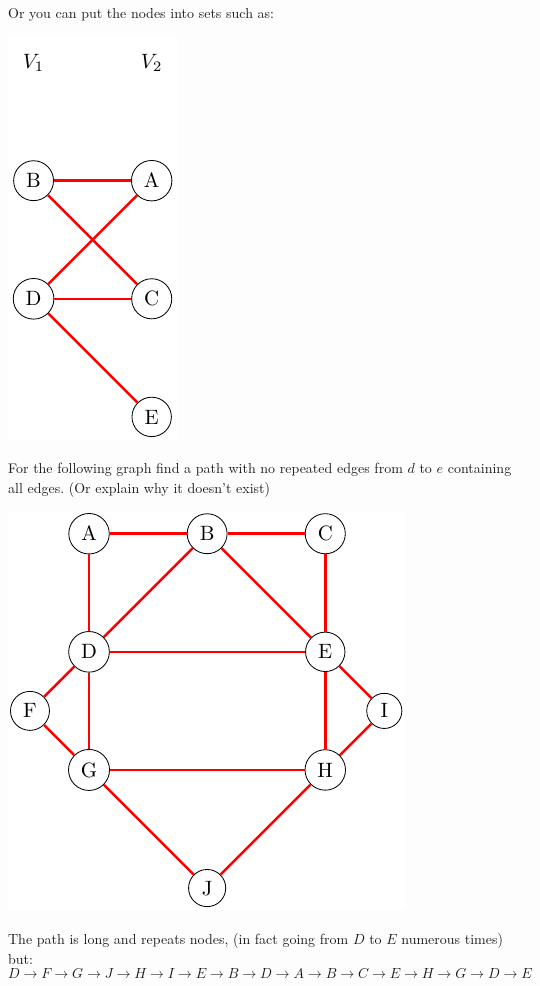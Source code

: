 \documentclass[addpoints]{exam}
\begin{document}
\begin{questions}
\begin{solution}
    Or you can put the nodes into sets such as:
    \begin{center}
      \includegraphics{graph1sets}
    \end{center}
  \end{solution}

  \question For the following graph find a path with no repeated edges from $d$ to $e$ containing all edges. (Or explain why it doesn't exist)
  \begin{center}
    \includegraphics{graph2}
  \end{center}
  \vspace*{\fill}
  \begin{solution}
    The path is long and repeats nodes, (in fact going from $D$ to $E$ numerous times) but:
    \[
      D\to F \to G \to J \to H \to I \to E \to B \to D \to A \to B \to C \to E \to H \to G\to D\to E
    \]


\end{solution}
\end{questions}
\end{document}
